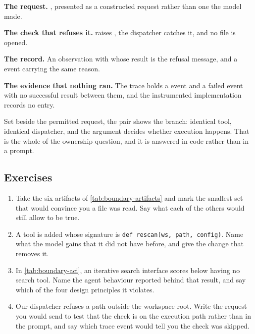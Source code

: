\bi

\item \textbf{The request.} , presented as a constructed request rather than one the model made.

\item \textbf{The check that refuses it.}  raises
, the dispatcher catches it, and no file is opened.

\item \textbf{The record.} An observation with  whose result is the refusal
message, and a  event carrying the same reason.

\item \textbf{The evidence that nothing ran.} The trace holds a  event and a
failed  event with no successful result between them, and the instrumented
implementation records no entry.

\ei

Set beside the permitted request, the pair shows the branch: identical tool, identical dispatcher,
and the argument decides whether execution happens. That is the whole of the ownership question, and
it is answered in code rather than in a prompt.

\subsection{Exercises}

\begin{enumerate}
\item Take the six artifacts of \cref{tab:boundary-artifacts} and mark the smallest set that would
  convince you a file was read. Say what each of the others would still allow to be true.
\item A tool is added whose signature is \verb|def rescan(ws, path, config)|. Name what the model
  gains that it did not have before, and give the change that removes it.
\item In \cref{tab:boundary-aci}, an iterative search interface scores below having no search tool.
  Name the agent behaviour reported behind that result, and say which of the four design principles
  it violates.
\item Our dispatcher refuses a path outside the workspace root. Write the request you would send to
  test that the check is on the execution path rather than in the prompt, and say which trace event
  would tell you the check was skipped.
\end{enumerate}

